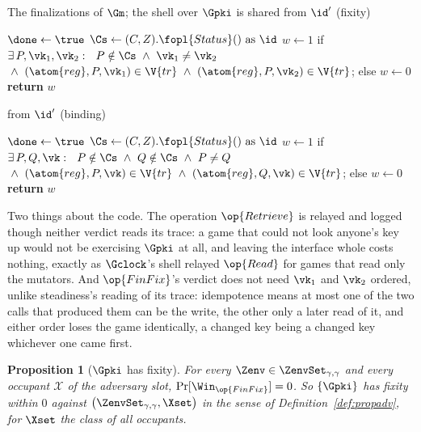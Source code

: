 \documentclass[10pt,oneside,openany]{book}
\theoremstyle{accentdef}
\theoremstyle{accentplain}
\newtheorem{proposition}[definition]{Proposition}
\begin{document}
\begin{interface}[nofloat]{The finalizations of $\Gm$; the shell over $\Gpki$ is shared}
 \quad from $\id'$ \quad (fixity)
\begin{algorithmic}[1]
\algcont
\Req{$\neg\done$}
\State $\done \gets \true$
\State $\Cs \gets (C,Z).\fopl{Status}() \text{ as } \id$
\State $w \gets 1$ if $\exists\, P,\vk_1,\vk_2 :\ \
       P \notin \Cs \ \wedge\ \vk_1 \neq \vk_2$ \label{ln:gpkifix}
\State \quad ${}\wedge\ (\atom{reg},P,\vk_1) \in \V{tr} \ \wedge\ (\atom{reg},P,\vk_2) \in \V{tr}$;
\State else $w \gets 0$
\State \textbf{return} $w$
\algsave
\end{algorithmic}
\vspace{1.4ex}

 \quad from $\id'$ \quad (binding)
\begin{algorithmic}[1]
\algcont
\Req{$\neg\done$}
\State $\done \gets \true$
\State $\Cs \gets (C,Z).\fopl{Status}() \text{ as } \id$
\State $w \gets 1$ if $\exists\, P,Q,\vk :\ \
       P \notin \Cs \ \wedge\ Q \notin \Cs \ \wedge\ P \neq Q$ \label{ln:gpkibind}
\State \quad ${}\wedge\ (\atom{reg},P,\vk) \in \V{tr} \ \wedge\ (\atom{reg},Q,\vk) \in \V{tr}$;
\State else $w \gets 0$
\State \textbf{return} $w$
\algsave
\end{algorithmic}
\end{interface}

Two things about the code. The operation $\op{Retrieve}$ is relayed and logged though neither verdict reads its
trace: a game that could not look anyone's key up would not be exercising $\Gpki$ at all, and
leaving the interface whole costs nothing, exactly as $\Gclock$'s shell relayed $\op{Read}$ for
games that read only the mutators. And $\op{FinFix}$'s verdict does not need $\vk_1$ and $\vk_2$ ordered,
unlike steadiness's reading of its trace: idempotence means at most one of the two calls that
produced them can be the write, the other only a later read of it, and either order loses the game
identically, a changed key being a changed key whichever one came first.

\begin{proposition}[$\Gpki$ has fixity]\label{prop:pkifix}
For every $\Zenv \in \ZenvSet_{\gamma,\gamma}$ and every occupant $\mathcal{X}$ of the adversary
slot, $\Pr[\Win_{\op{FinFix}}] = 0$. So $\{\Gpki\}$ has fixity within $0$ against
$\bigl(\ZenvSet_{\gamma,\gamma},\Xset\bigr)$ in the sense of Definition~\ref{def:propadv}, for
$\Xset$ the class of all occupants.
\end{proposition}
\end{document}
